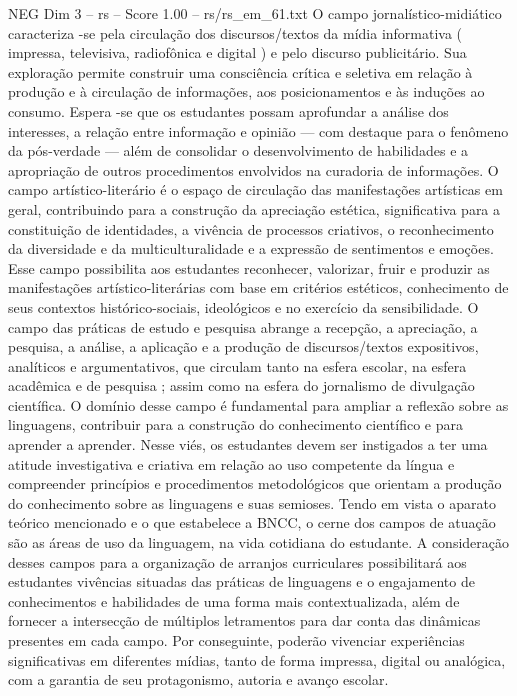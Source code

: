 \begin{textsample}{NEG Dim 3 – rs – Score 1.00 – rs/rs\_em\_61.txt}
O campo jornalístico-midiático caracteriza -se pela circulação dos discursos/textos da mídia informativa ( impressa, televisiva, radiofônica e digital ) e pelo discurso publicitário.
Sua exploração permite construir uma consciência crítica e seletiva em relação à produção e à circulação de informações, aos posicionamentos e às induções ao consumo.
Espera -se que os estudantes possam aprofundar a análise dos interesses, a relação entre informação e opinião — com destaque para o fenômeno da pós-verdade — além de consolidar o desenvolvimento de habilidades e a apropriação de outros procedimentos envolvidos na curadoria de informações.
O campo artístico-literário é o espaço de circulação das manifestações artísticas em geral, contribuindo para a construção da apreciação estética, significativa para a constituição de identidades, a vivência de processos criativos, o reconhecimento da diversidade e da multiculturalidade e a expressão de sentimentos e emoções.
Esse campo possibilita aos estudantes reconhecer, valorizar, fruir e produzir as manifestações artístico-literárias com base em critérios estéticos, conhecimento de seus contextos histórico-sociais, ideológicos e no exercício da sensibilidade.
O campo das práticas de estudo e pesquisa abrange a recepção, a apreciação, a pesquisa, a análise, a aplicação e a produção de discursos/textos expositivos, analíticos e argumentativos, que circulam tanto na esfera escolar, na esfera acadêmica e de pesquisa ; assim como na esfera do jornalismo de divulgação científica.
O domínio desse campo é fundamental para ampliar a reflexão sobre as linguagens, contribuir para a construção do conhecimento científico e para aprender a aprender.
Nesse viés, os estudantes devem ser instigados a ter uma atitude investigativa e criativa em relação ao uso competente da língua e compreender princípios e procedimentos metodológicos que orientam a produção do conhecimento sobre as linguagens e suas semioses.
Tendo em vista o aparato teórico mencionado e o que estabelece a BNCC, o cerne dos campos de atuação são as áreas de uso da linguagem, na vida cotidiana do estudante.
A consideração desses campos para a organização de arranjos curriculares possibilitará aos estudantes vivências situadas das práticas de linguagens e o engajamento de conhecimentos e habilidades de uma forma mais contextualizada, além de fornecer a intersecção de múltiplos letramentos para dar conta das dinâmicas presentes em cada campo.
Por conseguinte, poderão vivenciar experiências significativas em diferentes mídias, tanto de forma impressa, digital ou analógica, com a garantia de seu protagonismo, autoria e avanço escolar.

\end{textsample}
